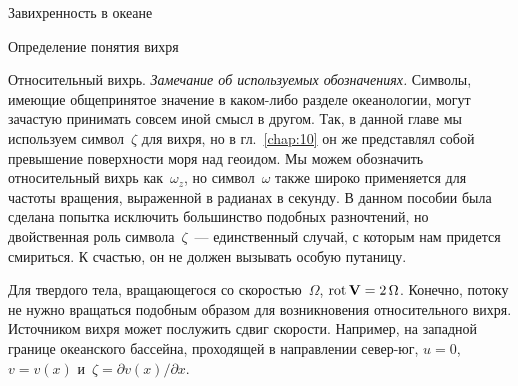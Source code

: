 \begin{chapter}{Завихренность в океане}
\begin{section}{Определение понятия вихря}
\begin{paragraph}{Относительный вихрь.}
\emph{Замечание об используемых обозначениях.} Символы, имеющие общепринятое
значение в каком-либо разделе океанологии, могут зачастую принимать совсем 
иной смысл в другом. Так, в данной главе мы используем символ~$\zeta$
для вихря, но в гл.~\ref{chap:10} он же представлял собой превышение
поверхности моря над геоидом. Мы можем обозначить относительный
вихрь как~$\omega_z$, но символ~$\omega$ также широко применяется для 
частоты вращения, выраженной в радианах в секунду. 
В данном пособии была сделана попытка исключить большинство подобных
разночтений, но двойственная роль символа~$\zeta$~--- единственный случай, 
с которым нам придется смириться. К счастью, он не должен вызывать особую 
путаницу.
%

Для твердого тела, вращающегося со скоростью~$\Omega$, 
$\mathop{\mathrm{rot}}\nolimits\mathbf{V} = 2\,\Omega$. Конечно, потоку не нужно вращаться подобным образом
для возникновения относительного вихря. Источником вихря может послужить
сдвиг скорости. Например, на западной границе океанского бассейна, проходящей 
в направлении север-юг, $u=0$, $v=v(x)$ 
и~$\zeta = \partial{v(x)}/\partial{x}$.
%


\end{paragraph}
\end{section}
\end{chapter}
